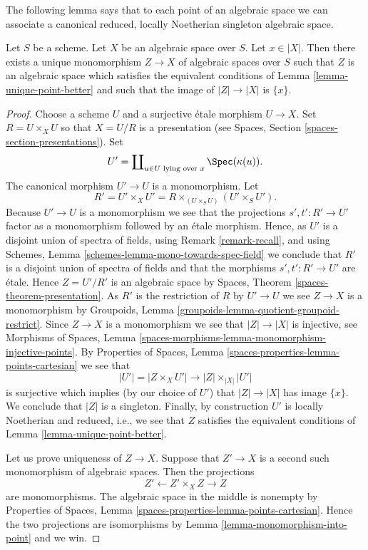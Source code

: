 \noindent
The following lemma says that to each point of an algebraic space we
can associate a canonical reduced, locally Noetherian singleton
algebraic space.

\begin{lemma}
\label{lemma-find-singleton-from-point}
Let $S$ be a scheme. Let $X$ be an algebraic space over $S$.
Let $x \in |X|$. Then there exists a unique monomorphism
$Z \to X$ of algebraic spaces
over $S$ such that $Z$ is an algebraic space which satisfies the equivalent
conditions of
Lemma \ref{lemma-unique-point-better}
and such that the image of $|Z| \to |X|$ is $\{x\}$.
\end{lemma}

\begin{proof}
Choose a scheme $U$ and a surjective \'etale morphism $U \to X$.
Set $R = U \times_X U$ so that $X = U/R$ is a presentation (see
Spaces, Section \ref{spaces-section-presentations}).
Set
$$
U' = \coprod\nolimits_{u \in U\text{ lying over }x} \Spec(\kappa(u)).
$$
The canonical morphism $U' \to U$ is a monomorphism. Let
$$
R' = U' \times_X U' = R \times_{(U \times_S U)} (U' \times_S U').
$$
Because $U' \to U$ is a monomorphism we see that the projections
$s', t' : R' \to U'$ factor as a monomorphism followed by an
\'etale morphism. Hence, as $U'$ is a disjoint union of spectra
of fields, using
Remark \ref{remark-recall},
and using
Schemes, Lemma \ref{schemes-lemma-mono-towards-spec-field}
we conclude that $R'$ is a disjoint union of spectra of fields and
that the morphisms $s', t' : R' \to U'$ are \'etale. Hence
$Z = U'/R'$ is an algebraic space by
Spaces, Theorem \ref{spaces-theorem-presentation}.
As $R'$ is the restriction of $R$ by $U' \to U$ we see
$Z \to X$ is a monomorphism by
Groupoids, Lemma \ref{groupoids-lemma-quotient-groupoid-restrict}.
Since $Z \to X$ is a monomorphism we see that $|Z| \to |X|$ is injective, see
Morphisms of Spaces, Lemma
\ref{spaces-morphisms-lemma-monomorphism-injective-points}.
By
Properties of Spaces, Lemma \ref{spaces-properties-lemma-points-cartesian}
we see that
$$
|U'| = |Z \times_X U'| \to |Z| \times_{|X|} |U'|
$$
is surjective which implies (by our choice of $U'$) that
$|Z| \to |X|$ has image $\{x\}$. We conclude that $|Z|$ is a singleton.
Finally, by construction $U'$ is locally Noetherian and reduced, i.e.,
we see that $Z$ satisfies the equivalent conditions of
Lemma \ref{lemma-unique-point-better}.

\medskip\noindent
Let us prove uniqueness of $Z \to X$. Suppose that
$Z' \to X$ is a second such monomorphism of algebraic spaces.
Then the projections
$$
Z' \longleftarrow Z' \times_X Z \longrightarrow Z
$$
are monomorphisms. The algebraic space in the middle is nonempty by
Properties of Spaces,
Lemma \ref{spaces-properties-lemma-points-cartesian}.
Hence the two projections are isomorphisms by
Lemma \ref{lemma-monomorphism-into-point}
and we win.
\end{proof}

